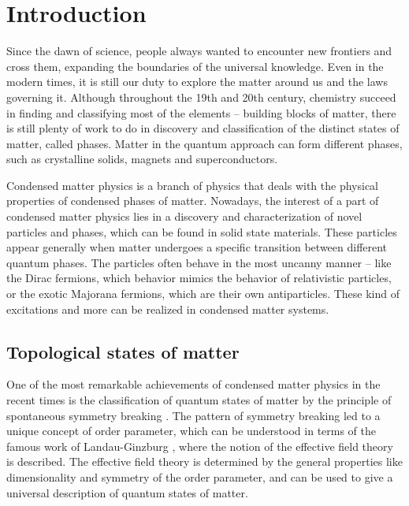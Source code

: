 \documentclass[titlepage,a4paper]{book}
\newcommand{\wciecie}{\quad\phantom{v}}
\begin{document}
\newcommand{\HRule}{\rule{\linewidth}{0.5mm}}



\newpage
\large
\thispagestyle{empty}
\tableofcontents


\newpage

\chapter{Introduction}
\label{chpt:Intro}
\wciecie
Since the dawn of science, people always wanted to encounter new frontiers and cross them, expanding the boundaries of the universal knowledge. Even in the modern times, it is still our duty to explore the matter around us and the laws governing it. Although throughout the 19th  and 20th century, chemistry succeed in finding and classifying most of the elements -- building blocks of matter, there is still plenty of work to do in discovery and classification of the distinct states of matter, called phases. Matter in the quantum approach can form different phases, such as crystalline solids, magnets and superconductors.  

Condensed matter physics is a branch of physics that deals with the physical properties of condensed phases of matter. Nowadays, the interest of a part of condensed matter physics lies in a discovery and characterization of novel particles and phases, which can be found in solid state materials. These particles appear generally when matter undergoes a specific transition between different quantum phases. The particles often behave in the most uncanny manner -- like the Dirac fermions, which behavior mimics the behavior of relativistic particles, or the exotic Majorana fermions, which are their own antiparticles. These kind of excitations and more can be realized in condensed matter systems. 

\section{Topological states of matter}
\wciecie
One of the most remarkable achievements of condensed matter physics in the recent times is the classification of quantum states of matter by the principle of spontaneous symmetry breaking \cite{Anderson_Topology}. The pattern of symmetry breaking led to a unique concept of order parameter, which can be understood in terms of the famous work of Landau-Ginzburg \cite{Landau_Topology}, where the notion of the effective field theory is described. The effective field theory is determined by the general properties like dimensionality and symmetry of the order parameter, and can be used to give a universal description of quantum states of matter.
\end{document}
